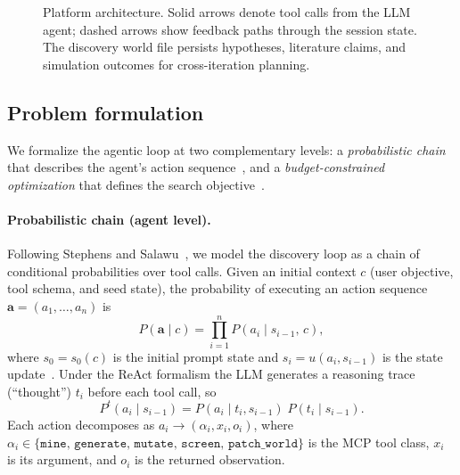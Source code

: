 \documentclass[twocolumn]{fairmeta}
\begin{document}
\begin{figure}[t]
\caption{Platform architecture. Solid arrows denote tool calls from the LLM agent; dashed arrows show feedback paths through the session state. The discovery world file persists hypotheses, literature claims, and simulation outcomes for cross-iteration planning.}
\label{fig:architecture}
\end{figure}

\subsection{Problem formulation}
\label{sec:formulation}

We formalize the agentic loop at two complementary levels: a \emph{probabilistic chain} that describes the agent's action sequence~\cite{stephens2025mathframing}, and a \emph{budget-constrained optimization} that defines the search objective~\cite{shahriari2016bayesopt}.

\paragraph{Probabilistic chain (agent level).}
Following Stephens and Salawu~\cite{stephens2025mathframing}, we model the discovery loop as a chain of conditional probabilities over tool calls.
Given an initial context $c$ (user objective, tool schema, and seed state), the probability of executing an action sequence $\mathbf{a} = (a_1, \ldots, a_n)$ is
\begin{equation}
P(\mathbf{a} \mid c) = \prod_{i=1}^{n} P(a_i \mid s_{i-1},\, c),
\label{eq:chain}
\end{equation}
where $s_0 = s_0(c)$ is the initial prompt state and $s_i = u(a_i, s_{i-1})$ is the state update~\cite{puterman1994mdp}.
Under the ReAct formalism the LLM generates a reasoning trace (``thought'') $t_i$ before each tool call, so
\begin{equation}
P^t(a_i \mid s_{i-1}) = P(a_i \mid t_i, s_{i-1})\; P(t_i \mid s_{i-1}).
\label{eq:react}
\end{equation}
Each action decomposes as $a_i \to (\alpha_i, x_i, o_i)$, where $\alpha_i \in \{\texttt{mine},\, \texttt{generate},\, \texttt{mutate},\, \texttt{screen},\, \texttt{patch\_world}\}$ is the MCP tool class, $x_i$ is its argument, and $o_i$ is the returned observation.
\end{document}
